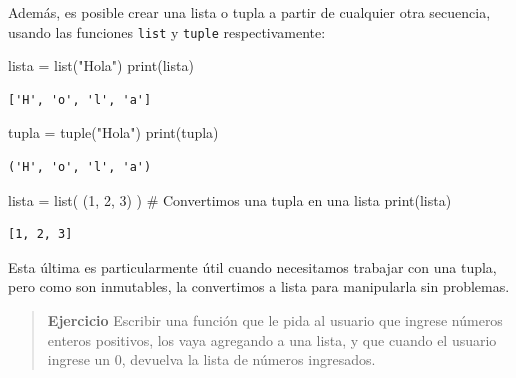\documentclass[
  letterpaper,
  DIV=11,
  numbers=noendperiod]{scrreprt}
\newenvironment{Shaded}{\begin{snugshade}}{\end{snugshade}}
\newcommand{\BuiltInTok}[1]{\textcolor[rgb]{0.00,0.23,0.31}{#1}}
\newcommand{\CommentTok}[1]{\textcolor[rgb]{0.37,0.37,0.37}{#1}}
\newcommand{\DecValTok}[1]{\textcolor[rgb]{0.68,0.00,0.00}{#1}}
\newcommand{\NormalTok}[1]{\textcolor[rgb]{0.00,0.23,0.31}{#1}}
\newcommand{\OperatorTok}[1]{\textcolor[rgb]{0.37,0.37,0.37}{#1}}
\newcommand{\StringTok}[1]{\textcolor[rgb]{0.13,0.47,0.30}{#1}}
\begin{document}
Además, es posible crear una lista o tupla a partir de cualquier otra
secuencia, usando las funciones \texttt{list} y \texttt{tuple}
respectivamente:

\begin{Shaded}
\begin{Highlighting}[]
\NormalTok{lista }\OperatorTok{=} \BuiltInTok{list}\NormalTok{(}\StringTok{"Hola"}\NormalTok{)}
\BuiltInTok{print}\NormalTok{(lista)}
\end{Highlighting}
\end{Shaded}

\begin{verbatim}
['H', 'o', 'l', 'a']
\end{verbatim}

\begin{Shaded}
\begin{Highlighting}[]
\NormalTok{tupla }\OperatorTok{=} \BuiltInTok{tuple}\NormalTok{(}\StringTok{"Hola"}\NormalTok{)}
\BuiltInTok{print}\NormalTok{(tupla)}
\end{Highlighting}
\end{Shaded}

\begin{verbatim}
('H', 'o', 'l', 'a')
\end{verbatim}

\begin{Shaded}
\begin{Highlighting}[]
\NormalTok{lista }\OperatorTok{=} \BuiltInTok{list}\NormalTok{( (}\DecValTok{1}\NormalTok{, }\DecValTok{2}\NormalTok{, }\DecValTok{3}\NormalTok{) ) }\CommentTok{\# Convertimos una tupla en una lista}
\BuiltInTok{print}\NormalTok{(lista)}
\end{Highlighting}
\end{Shaded}

\begin{verbatim}
[1, 2, 3]
\end{verbatim}

Esta última es particularmente útil cuando necesitamos trabajar con una
tupla, pero como son inmutables, la convertimos a lista para manipularla
sin problemas.

\begin{quote}
\textbf{Ejercicio} Escribir una función que le pida al usuario que
ingrese números enteros positivos, los vaya agregando a una lista, y que
cuando el usuario ingrese un 0, devuelva la lista de números ingresados.
\end{quote}
\end{document}
